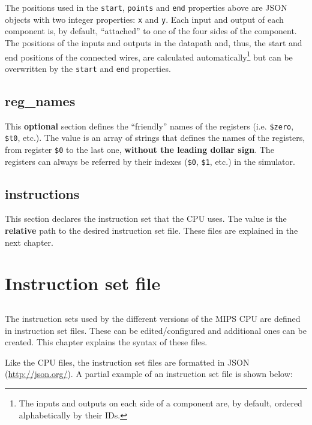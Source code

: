 \documentclass[11pt,a4paper,twoside,titlepage]{report}
\begin{document}
The positions used in the \verb+start+, \verb+points+ and \verb+end+ properties
above are JSON objects with two integer properties: \verb+x+ and \verb+y+.
Each input and output of each component is, by default, ``attached'' to one of
the four sides of the component.
The positions of the inputs and outputs in the datapath and, thus, the start and
end positions of the connected wires, are calculated automatically\footnote{The
inputs and outputs on each side of a component are, by default, ordered 
alphabetically by their IDs.} but can be overwritten by the \verb+start+ and 
\verb+end+ properties.


\section{reg\_names}

This \textbf{optional} section defines the ``friendly'' names of the registers (i.e.
\verb+$zero+, \verb+$t0+, etc.).
The value is an array of strings that defines the names of the registers, from
register \verb+$0+ to the last one, \textbf{without the leading dollar sign}.
The registers can always be referred by their indexes (\verb+$0+, \verb+$1+, etc.) 
in the simulator.


\section{instructions}

This section declares the instruction set that the CPU uses.
The value is the \textbf{relative} path to the desired instruction set file.
These files are explained in the next chapter.


\chapter{Instruction set file}

\section*{}

The instruction sets used by the different versions of the MIPS CPU
are defined in instruction set files.
These can be edited/configured and additional ones can be created.
This chapter explains the syntax of these files.

Like the CPU files, the instruction set files are formatted in 
JSON (\url{http://json.org/}).
A partial example of an instruction set file is shown below:
\end{document}
